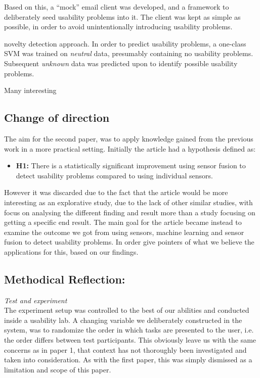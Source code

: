  Based on this, a ``mock'' email client was developed, and a framework to deliberately seed
usability problems into it. The client was kept as simple as possible, in order to avoid unintentionally introducing
usability problems.

 
novelty detection approach.
In order to predict usability problems, a one-class SVM was trained on \textit{neutral} data, presumably containing no
usability problems. Subsequent \textit{unknown} data was predicted upon to identify possible usability problems.

Many interesting 

\subsection{Change of direction}
The aim for the second paper, was to apply knowledge gained from the previous work in a more practical setting. 
Initially the article had a hypothesis defined as:
\begin{itemize}
    \item \textbf{H1:} There is a statistically significant improvement using sensor fusion to detect usability problems compared to using individual sensors.
\end{itemize}
However it was discarded due to the fact that the article would be more interesting as an explorative study, due to the lack of other similar studies, with focus on analysing the different finding and result more than a study focusing on getting a specific end result.
The main goal for the article became instead to examine the outcome we got from using sensors, machine learning and sensor fusion to detect usability problems.
In order give pointers of what we believe the applications for this, based on our findings.

\subsection{Methodical Reflection:}
\textit{Test and experiment}\\
The experiment setup was controlled to the best of our abilities and conducted inside a usability lab. A changing
variable we deliberately constructed in the system, was to randomize the order in which tasks are presented to the user,
i.e. the order differs between test participants.
This obviously leave us with the same concerns as in paper 1, that context has not thoroughly been investigated and taken
into consideration. As with the first paper, this was simply dismissed as a limitation and scope of this paper.

